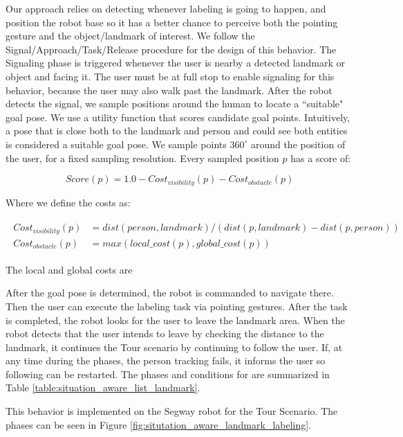 \documentclass[12pt]{gatech-thesis}
\begin{document}
Our approach relies on detecting whenever labeling is going to happen, and position the robot base so it has a better chance to perceive both the pointing gesture and the object/landmark of interest. We follow the Signal/Approach/Task/Release procedure for the design of this behavior. The Signaling phase is triggered whenever the user is nearby a detected landmark or object and facing it. The user must be at full stop to enable signaling for this behavior, because the user may also walk past the landmark. After the robot detects the signal, we sample positions around the human to locate a ``suitable" goal pose. We use a utility function that scores candidate goal points. Intuitively, a pose that is close both to the landmark and person and could see both entities is considered a suitable goal pose. We sample points $360^{\circ}$ around the position of the user, for a fixed sampling resolution. Every sampled position $p$ has a score of:

\[
Score(p) = 1.0 - Cost_{visibility}(p) - Cost_{obstacle}(p)
\]

Where we define the costs as:

\begin{align} 
\begin{split} 
Cost_{visibility}(p)&=dist(person,landmark)/(dist(p,landmark) -dist(p,person)) \\
Cost_{obstacle}(p)&=max( local\_cost(p),global\_cost(p))  
\end{split} 
\end{align}

The local and global costs are 


After the goal pose is determined, the robot is commanded to navigate there. Then the user can execute the labeling task via pointing gestures. After the task is completed, the robot looks for the user to leave the landmark area. When the robot detects that the user intends to leave by checking the distance to the landmark, it continues the Tour scenario by continuing to follow the user. If, at any time during the phases, the person tracking fails, it informs the user so following can be restarted. The phases and conditions for are summarized in Table \ref{table:situation_aware_list_landmark}.

This behavior is implemented on the Segway robot for the Tour Scenario. The phases can be seen in Figure \ref{fig:situtation_aware_landmark_labeling}.
\end{document}
